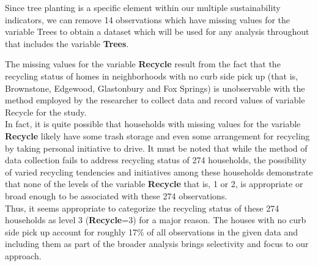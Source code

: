 \documentclass{article}
\begin{document}
Since tree planting is a specific element within our multiple sustainability indicators, we can remove 14 observations which have missing values for the variable Trees to obtain a dataset which will be used for any analysis throughout that includes the variable \textbf{Trees}.

\begin{Schunk}
\end{Schunk}

The missing values for the variable \textbf{Recycle} result from the fact that the recycling status of homes in neighborhoods with no curb side pick up (that is, Brownstone, Edgewood, Glastonbury and Fox Springs) is unobservable with the method employed by the researcher to collect data and record values of variable Recycle for the study.\\

In fact, it is quite possible that households with missing values for the variable \textbf{Recycle} likely have some trash storage and even some arrangement for recycling by taking personal initiative to drive. It must be noted that while the method of data collection fails to address recycling status of 274 households, the possibility of varied recycling tendencies and initiatives among these households demonstrate that none of the levels of the variable \textbf{Recycle} that is, 1 or 2, is appropriate or broad enough to be associated with these 274 observations. \\

Thus, it seems appropriate to categorize the recycling status of these 274 households as level 3 (\textbf{Recycle}=3) for a major reason. The houses with no curb side pick up account for roughly 17\% of all observations in the given data and including them as part of the broader analysis brings selectivity and focus to our approach.

\begin{Schunk}
\end{Schunk}
\end{document}
